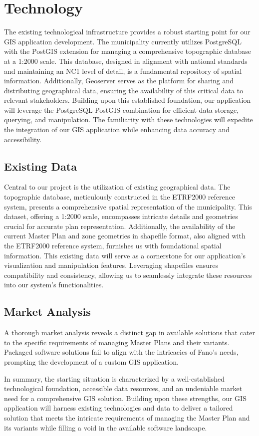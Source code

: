 
\chapter{Technology}
\label{chp:Technology}

The existing technological infrastructure provides a robust starting point for our GIS application development. The municipality currently utilizes PostgreSQL with the PostGIS extension for managing a comprehensive topographic database at a 1:2000 scale. This database, designed in alignment with national standards and maintaining an NC1 level of detail, is a fundamental repository of spatial information. Additionally, Geoserver serves as the platform for sharing and distributing geographical data, ensuring the availability of this critical data to relevant stakeholders. Building upon this established foundation, our application will leverage the PostgreSQL-PostGIS combination for efficient data storage, querying, and manipulation. The familiarity with these technologies will expedite the integration of our GIS application while enhancing data accuracy and accessibility.

\section{Existing Data}

Central to our project is the utilization of existing geographical data. The topographic database, meticulously constructed in the ETRF2000 reference system, presents a comprehensive spatial representation of the municipality. This dataset, offering a 1:2000 scale, encompasses intricate details and geometries crucial for accurate plan representation. Additionally, the availability of the current Master Plan and zone geometries in shapefile format, also aligned with the ETRF2000 reference system, furnishes us with foundational spatial information. This existing data will serve as a cornerstone for our application's visualization and manipulation features. Leveraging shapefiles ensures compatibility and consistency, allowing us to seamlessly integrate these resources into our system's functionalities.

\section{Market Analysis}

A thorough market analysis reveals a distinct gap in available solutions that cater to the specific requirements of managing Master Plans and their variants. Packaged software solutions fail to align with the intricacies of Fano's needs, prompting the development of a custom GIS application. 

In summary, the starting situation is characterized by a well-established technological foundation, accessible data resources, and an undeniable market need for a comprehensive GIS solution. Building upon these strengths, our GIS application will harness existing technologies and data to deliver a tailored solution that meets the intricate requirements of managing the Master Plan and its variants while filling a void in the available software landscape.
